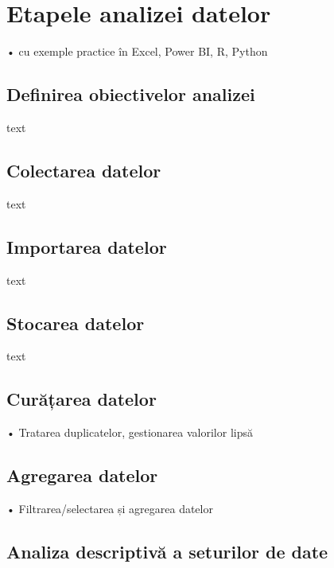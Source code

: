 \documentclass[
  11pt,
  b5paper,
  nottoc]{book}
\begin{document}

\chapter{Etapele analizei datelor}\label{cap7}

• cu exemple practice în Excel, Power BI, R, Python

\section{Definirea obiectivelor
analizei}\label{definirea-obiectivelor-analizei}

text

\section{Colectarea datelor}\label{colectarea-datelor}

text

\section{Importarea datelor}\label{importarea-datelor}

text

\section{Stocarea datelor}\label{stocarea-datelor}

text

\section{Curățarea datelor}\label{curux103ux21barea-datelor}

• Tratarea duplicatelor, gestionarea valorilor lipsă

\section{Agregarea datelor}\label{agregarea-datelor}

• Filtrarea/selectarea și agregarea datelor

\section{Analiza descriptivă a seturilor de
date}\label{analiza-descriptivux103-a-seturilor-de-date}
\end{document}

